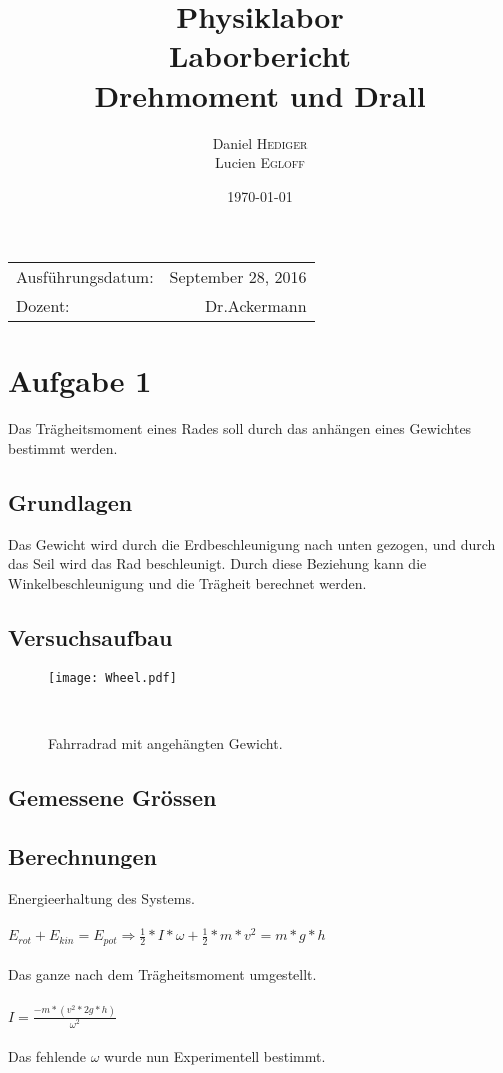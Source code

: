 \documentclass{article}
\title{Physiklabor \\ Laborbericht \\ Drehmoment und Drall} %
\author{Daniel \textsc{Hediger} \\ Lucien \textsc{Egloff}} %
\date{\today} %
\begin{document}
\maketitle %

\begin{center}
\begin{tabular}{l r}
Ausführungsdatum: & September 28, 2016 \\ %
Dozent: & Dr.Ackermann %
\end{tabular}
\end{center}
\newpage
\tableofcontents 

\newpage
\section{Aufgabe 1}


Das Trägheitsmoment eines Rades soll durch das anhängen eines Gewichtes bestimmt werden.

\subsection{Grundlagen}

Das Gewicht wird durch die Erdbeschleunigung nach unten gezogen, und durch das Seil wird das Rad beschleunigt. Durch diese Beziehung kann die Winkelbeschleunigung und die Trägheit berechnet werden.

\subsection{Versuchsaufbau}
\begin{figure}[h]
\center

\texttt{[image: Wheel.pdf]} 
\caption{Fahrradrad mit angehängten Gewicht.}
\
\end{figure}
\subsection{Gemessene Grössen}
\subsection{Berechnungen}
Energieerhaltung des Systems.\\\\
$E_{rot}+E_{kin}=E_{pot}  \Rightarrow\frac{1}{2}*I*\omega+\frac{1}{2}*m*v^2=m*g*h$\\\\
Das ganze nach dem Trägheitsmoment umgestellt.\\\\
$I=\frac{-m*(v^2*2g*h)}{\omega^2} $\\\\
Das fehlende $\omega$ wurde nun Experimentell bestimmt.
\end{document}
